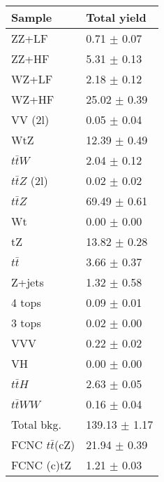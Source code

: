 	\begin{tabular}{|l|l|}
	\hline
	\textbf{Sample}                  			 & \textbf{Total yield}     \\
	\hline
	ZZ+LF                 & 0.71 $\pm$ 0.07          \\   
	ZZ+HF                 & 5.31 $\pm$ 0.13         \\   
	WZ+LF                  & 2.18 $\pm$ 0.12         \\   
	WZ+HF                  & 25.02 $\pm$ 0.39         \\   
	VV (2l)                 					  & 0.05 $\pm$ 0.04                             \\   
	WtZ                       					  & 12.39 $\pm$ 0.49                                \\   
	$t\bar{t}W$             					  & 2.04 $\pm$ 0.12                             \\   
	$t\bar{t}Z$ (2l)       					      & 0.02 $\pm$ 0.02                             \\   
	$t\bar{t}Z$           &69.49 $\pm$ 0.61   \\   
	Wt                      					  & 0.00 $\pm$ 0.00                           \\   
	tZ                      					  & 13.82 $\pm$ 0.28                            \\     
	$t\bar{t}$             						  & 3.66 $\pm$ 0.37                            \\   
	Z+jets                 						  & 1.32 $\pm$ 0.58                            \\   
	4 tops                 						  & 0.09 $\pm$ 0.01                           \\   
	3 tops                 						  & 0.02 $\pm$ 0.00                           \\   
	VVV                     					  & 0.22 $\pm$ 0.02                           \\   
	VH                      					  & 0.00 $\pm$ 0.00                           \\   
	$t\bar{t}H$             					  & 2.63 $\pm$ 0.05                           \\   
	$t\bar{t}WW$          					      & 0.16 $\pm$ 0.04                           \\   
	\hline                                                                    
	Total bkg.              					  &  139.13 $\pm$ 1.17                          \\       
	\hline                                                                     
	FCNC $t\bar{t}$(cZ)   					      &  21.94 $\pm$ 0.39                \\
	FCNC (c)tZ              				      &  1.21 $\pm$ 0.03                          \\
	\hline
\end{tabular}